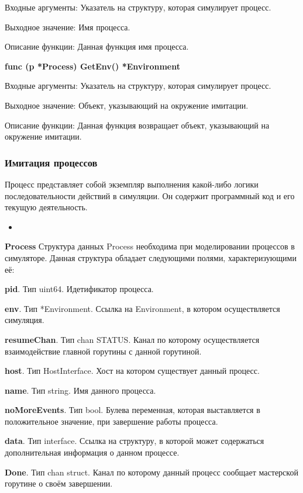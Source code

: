 Входные аргументы: Указатель на структуру, которая симулирует процесс.

Выходное значение: Имя процесса.

Описание функции: Данная функция имя процесса.

\textbf{func (p *Process) GetEnv() *Environment}

Входные аргументы: Указатель на структуру, которая симулирует процесс.

Выходное значение: Объект, указывающий на окружение имитации.

Описание функции: Данная функция возвращает объект, указывающий на окружение имитации.

\subsubsection{Имитация процессов}
\par 
Процесс представляет собой экземпляр выполнения какой-либо логики последовательности действий в симуляции. Он содержит программный код и его текущую деятельность.
\begin{itemize}
	\item 
\end{itemize}

\textbf{Process}
Структура данных Process необходима при моделировании процессов в симуляторе. Данная структура обладает следующими полями, характеризующими  её:

\textbf{	pid}. Тип uint64. Идетификатор процесса. 

\textbf{	env}. Тип        *Environment. Ссылка на Environment, в котором осуществляется симуляция. 

\textbf{	resumeChan}. Тип chan STATUS. Канал по которому осуществляется взаимодействие главной горутины с данной горутиной. 

\textbf{	host}. Тип       HostInterface. Хост на котором существует данный процесс. 

\textbf{	name}. Тип         string. Имя данного процесса. 

\textbf{	noMoreEvents}. Тип bool. Булева переменная, которая выставляется в положительное значение, при завершение работы процесса.

\textbf{	data}. Тип         interface. Ссылка на  структуру, в  которой может содержаться дополнительная информация о данном процессе.

\textbf{	Done}. Тип chan struct. Канал по которому данный процесс сообщает мастерской горутине о своём завершении. 

